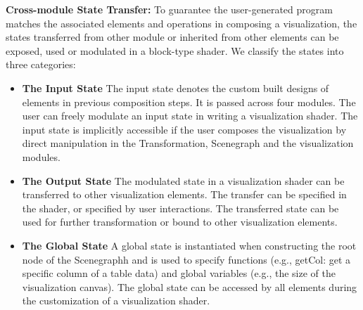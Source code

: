 \noindent \textbf{Cross-module State Transfer:} To guarantee the user-generated program matches the associated elements and operations in composing a visualization, the states transferred from other module or inherited from other elements  can be exposed, used or modulated in a block-type shader.  We classify the states into three categories:
\begin{itemize}
  \item \noindent \textbf{The Input State} The input state denotes the custom built designs of elements in previous composition steps. It is  passed across four modules. The user can freely modulate an input state in writing a visualization shader. The input state is implicitly accessible if the user composes the visualization by direct manipulation in the Transformation, Scenegraph and the visualization modules.
  \item \noindent \textbf{The Output State} The modulated state in a visualization shader can be transferred to other visualization elements. The transfer can be specified in the shader, or specified by user interactions. The transferred state can be used for further transformation or bound to other visualization elements.
  \item
\noindent \textbf{The Global State} A global state is  instantiated when constructing the root node of the Scenegraphh and is used to specify functions (e.g., getCol: get a specific column of a table data) and global variables (e.g., the size of the visualization canvas).  The global state can be accessed by all elements during the customization of a visualization shader.
\end{itemize}


